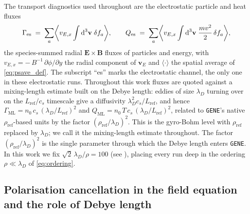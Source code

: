 \documentclass{jpp}
\newcommand{\rmd}{\text{d}}
\newcommand{\bv}{\mathbf{v}}
\renewcommand{\vec}[1]{\boldsymbol{#1}}
\newcommand{\vec}[1]{\boldsymbol{#1}}
\newcommand{\vE}{\vec{E}}
\newcommand{\vB}{\vec{B}}
\newcommand{\lambdaD}{\lambda_D}
\newcommand{\gene}{\texttt{GENE}}
\begin{document}
The transport diagnostics used throughout are the electrostatic particle and heat fluxes
\begin{equation}\label{eq:flux_def}
\Gamma_{\rm es} \;=\; \sum_a \biggl\langle v_{E,x} \int \rmd^3\bv\; \delta f_a \biggr\rangle,
\qquad
Q_{\rm es} \;=\; \sum_a \biggl\langle v_{E,x} \int \rmd^3\bv\; \frac{m v^2}{2}\, \delta f_a \biggr\rangle,
\end{equation}
the species-summed radial $\vE \times \vB$ fluxes of particles and energy, with $v_{E,x} = -\,B^{-1}\,\partial\phi/\partial y$ the radial component of $\vec{v}_E$ and $\langle\cdot\rangle$ the spatial average of \cref{eq:psave_def}. The subscript ``es'' marks the electrostatic channel, the only one in these electrostatic runs. Throughout this work fluxes are quoted against a mixing-length estimate built on the Debye length: eddies of size $\lambdaD$ turning over on the $L_\mathrm{ref}/c_s$ timescale give a diffusivity $\lambdaD^2 c_s/L_\mathrm{ref}$, and hence $\Gamma_\mathrm{ML} = n_0\,c_s\,(\lambdaD/L_\mathrm{ref})^2$ and $Q_\mathrm{ML} = n_0\,T\,c_s\,(\lambdaD/L_\mathrm{ref})^2$, related to \gene's native $\rho_\mathrm{ref}$-based units by the factor $(\rho_\mathrm{ref}/\lambdaD)^2$. This is the gyro-Bohm level with $\rho_\mathrm{ref}$ replaced by $\lambdaD$; we call it the mixing-length estimate throughout. The factor $(\rho_\mathrm{ref}/\lambdaD)^2$ is the single parameter through which the Debye length enters \gene. In this work we fix $\sqrt{2}\,\lambdaD/\rho = 100$ (see ), placing every run deep in the ordering $\rho \ll \lambdaD$ of \cref{eq:ordering}. 

\subsection{Polarisation cancellation in the field equation and the role of Debye length}\label{sec:polarisation}
\end{document}
